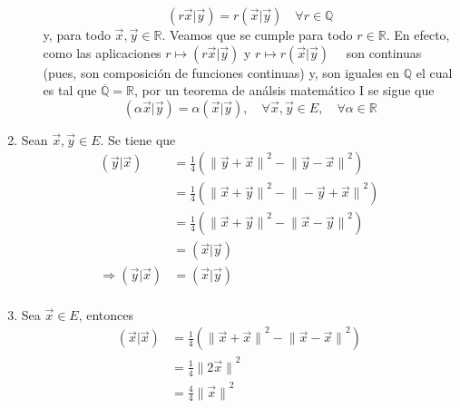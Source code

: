 \documentclass[12pt]{report}
\newcounter{it}
\theoremstyle{largebreak}
\newcommand\pint[2]{\ensuremath{\left(#1\big|#2\right)}}
\newcommand\norm[1]{\ensuremath{\|#1\|}}
\begin{document}
\begin{sol}
\begin{enumerate}
\begin{enumerate}
                \begin{equation*}
                    \pint{r\vec{x}}{\vec{y}}=r\pint{\vec{x}}{\vec{y}}\quad\forall r\in\mathbb{Q}
                \end{equation*}
                y, para todo $\vec{x},\vec{y}\in\mathbb{R}$. Veamos que se cumple para todo $r\in\mathbb{R}$. En efecto, como las aplicaciones $r\mapsto \pint{r\vec{x}}{\vec{y}}$ y $r\mapsto r\pint{\vec{x}}{\vec{y}}\quad$ son continuas (pues, son composición de funciones continuas) y, son iguales en $\mathbb{Q}$ el cual es tal que $\overline{\mathbb{Q}}=\mathbb{R}$, por un teorema de análsis matemático I se sigue que
                \begin{equation*}
                    \pint{\alpha \vec{x}}{\vec{y}}=\alpha\pint{\vec{x}}{\vec{y}},\quad\forall\vec{x},\vec{y}\in E,\quad\forall \alpha\in\mathbb{R}
                \end{equation*}
            \end{enumerate}
            \item Sean $\vec{x},\vec{y}\in E$. Se tiene que 
            \begin{equation*}
                \begin{split}
                    \pint{\vec{y}}{\vec{x}}&=\frac{1}{4}\left(\norm{\vec{y}+\vec{x}}^2-\norm{\vec{y}-\vec{x}}^2 \right)\\
                    &=\frac{1}{4}\left(\norm{\vec{x}+\vec{y}}^2-\norm{-\vec{y}+\vec{x}}^2 \right)\\
                    &=\frac{1}{4}\left(\norm{\vec{x}+\vec{y}}^2-\norm{\vec{x}-\vec{y}}^2 \right)\\
                    &=\pint{\vec{x}}{\vec{y}}\\
                    \Rightarrow \pint{\vec{y}}{\vec{x}}&=\pint{\vec{x}}{\vec{y}}\\
                \end{split}
            \end{equation*}
            \item Sea $\vec{x}\in E$, entonces
            \begin{equation*}
                \begin{split}
                    \pint{\vec{x}}{\vec{x}}&=\frac{1}{4}\left(\norm{\vec{x}+\vec{x}}^2-\norm{\vec{x}-\vec{x}}^2 \right)\\
                    &=\frac{1}{4}\norm{2\vec{x}}^2\\
                    &=\frac{4}{4}\norm{\vec{x}}^2\\

\end{split}
\end{equation*}
\end{enumerate}
\end{sol}
\end{document}
